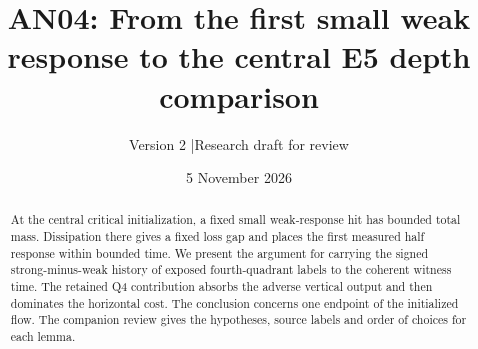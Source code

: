\documentclass[11pt]{article}
\title{AN04: From the first small weak response to the central E5 depth comparison}
\author{Version 2 \quad|\quad Research draft for review}
\date{5 November 2026}
\begin{document}
\maketitle
\begin{abstract}
At the central critical initialization, a fixed small weak-response hit has bounded total mass.
Dissipation there gives a fixed loss gap and places the first measured half response within bounded time.
We present the argument for carrying the signed strong-minus-weak history of exposed fourth-quadrant labels to the coherent witness time. The retained Q4 contribution absorbs the adverse vertical output and then dominates the horizontal cost. The conclusion concerns one endpoint of the initialized flow. The companion review gives the hypotheses, source labels and order of choices for each lemma.
\end{abstract}
\end{document}
